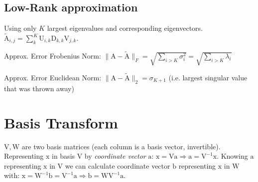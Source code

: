 \documentclass[a4paper, 11pt, landscape]{article}
\newcommand{\matr}[1]{\boldsymbol{\mathrm{#1}}}
\begin{document}
\begin{multicols*}{3}
\subsection{Low-Rank approximation}
Using only $K$ largest eigenvalues and corresponding eigenvectors. $\tilde{\matr{A}}_{i, j} = \sum_{k}^K \matr{U}_{i, k} \matr{D}_{k,k} \matr{V}_{j, k}$.
\begin{compactdesc}
	\item[Approx. Error Frobenius Norm:] $\|\matr{A} - \tilde{\matr{A}}\|_F = \sqrt{\sum_{i > K} \sigma_i^2} = \sqrt{\sum_{i > K} \lambda_i}$
	\item[Approx. Error Euclidean Norm:] $\|\matr{A} - \tilde{\matr{A}}\|_2 = \sigma_{K+1}$ (i.e. largest singular value that was thrown away)
\end{compactdesc}

\section{Basis Transform}
$\matr{V}, \matr{W}$ are two basis matrices (each column is a basis vector, invertible). Representing $\matr{x}$ in basis $\matr{V}$ by \emph{coordinate vector} $\matr{a}$: $\matr{x} = \matr{V} \matr{a} \Rightarrow \matr{a} = \matr{V}^{-1} \matr{x}$. Knowing $\matr{a}$ representing $\matr{x}$ in $\matr{V}$ we can calculate coordinate vector $\matr{b}$ representing $\matr{x}$ in $\matr{W}$ with: $\matr{x} = \matr{W}^{-1} \matr{b} = \matr{V}^{-1} \matr{a} \Rightarrow \matr{b} = \matr{W} \matr{V}^{-1} \matr{a}$.


\end{multicols*}
\end{document}
